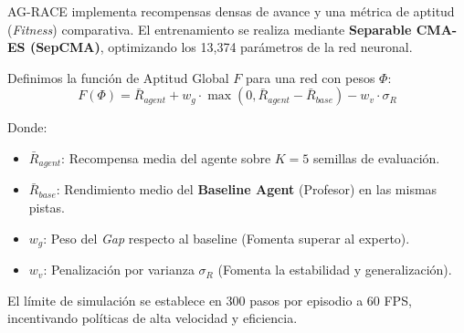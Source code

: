 \documentclass[a4paper,11pt]{article}
\begin{document}
AG-RACE implementa recompensas densas de avance y una métrica de aptitud (\textit{Fitness}) comparativa. El entrenamiento se realiza mediante \textbf{Separable CMA-ES (SepCMA)}, optimizando los 13,374 parámetros de la red neuronal.

Definimos la función de Aptitud Global $F$ para una red con pesos $\Phi$:
$$ F(\Phi) = \bar{R}_{agent} + w_g \cdot \max(0, \bar{R}_{agent} - \bar{R}_{base}) - w_v \cdot \sigma_{R} $$

Donde:
\begin{itemize}
    \item $\bar{R}_{agent}$: Recompensa media del agente sobre $K=5$ semillas de evaluación.
    \item $\bar{R}_{base}$: Rendimiento medio del \textbf{Baseline Agent} (Profesor) en las mismas pistas.
    \item $w_g$: Peso del \textit{Gap} respecto al baseline (Fomenta superar al experto).
    \item $w_v$: Penalización por varianza $\sigma_{R}$ (Fomenta la estabilidad y generalización).
\end{itemize}

El límite de simulación se establece en 300 pasos por episodio a 60 FPS, incentivando políticas de alta velocidad y eficiencia.
\end{document}
